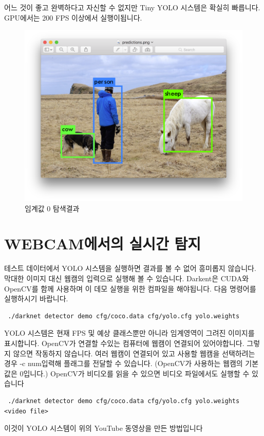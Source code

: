 \documentclass{article}
\begin{document}
어느 것이 좋고 완벽하다고 자신할 수 없지만 Tiny YOLO 시스템은 확실히 빠릅니다. 
GPU에서는 200 FPS 이상에서 실행이됩니다.
\begin{figure}[h!]
\centering
\includegraphics[scale=0.15]{tinyyolo.png}
\caption{임계값 0 탐색결과 }
\label{fig:tinyimg}
\end{figure}

\section{WEBCAM에서의 실시간 탐지}

테스트 데이터에서 YOLO 시스템을 실행하면 결과를 볼 수 없어 흥미롭지 않습니다. 
막대한 이미지 대신 웹캠의 입력으로 실행해 볼 수 있습니다.
Darkent은 CUDA와 OpenCV를 함께 사용하며 이 데모 실행을 위한 컴파일을 해야됩니다. 
다음 명령어를 실행하시기 바랍니다.
\begin{lstlisting}
 ./darknet detector demo cfg/coco.data cfg/yolo.cfg yolo.weights  
\end{lstlisting}
YOLO 시스템은 현재 FPS 및 예상 클래스뿐만 아니라 임계영역이 그려진 이미지를 표시합니다.
OpenCV가 연결할 수있는 컴퓨터에 웹캠이 연결되어 있어야합니다. 그렇지 않으면 작동하지 않습니다. 
여러 웹캠이 연결되어 있고 사용할 웹캠을 선택하려는 경우 -c \textlangle num\textrangle 입력해 플래그를 전달할 수 있습니다. 
(OpenCV가 사용하는 웹캠의 기본값은 0입니다.) OpenCV가 비디오를 읽을 수 있으면 비디오 파일에서도 실행할 수 있습니다

\begin{lstlisting}
 ./darknet detector demo cfg/coco.data cfg/yolo.cfg yolo.weights <video file> 
\end{lstlisting}
이것이 YOLO 시스템이 위의 YouTube 동영상을 만든 방법입니다
\end{document}
